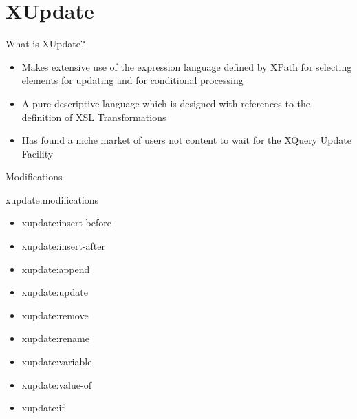 \documentclass[sans]{beamer}
\begin{document}

\section{XUpdate}


\begin{frame}{What is XUpdate?}
	\begin{itemize}
		\item Makes extensive use of the expression language defined by XPath for selecting elements for updating and for conditional processing
		\item A pure descriptive language which is designed with references to the definition of XSL Transformations
		\item Has found a niche market of users not content to wait for the XQuery Update Facility
	\end{itemize}
\end{frame}

\begin{frame}{Modifications}
	\begin{block}{xupdate:modifications}
	\begin{itemize}
		\item xupdate:insert-before
		\item xupdate:insert-after
		\item xupdate:append
		\item xupdate:update
		\item xupdate:remove
		\item xupdate:rename
		\item xupdate:variable
		\item xupdate:value-of
		\item xupdate:if
	\end{itemize}
	\end{block}
\end{frame}
\end{document}
